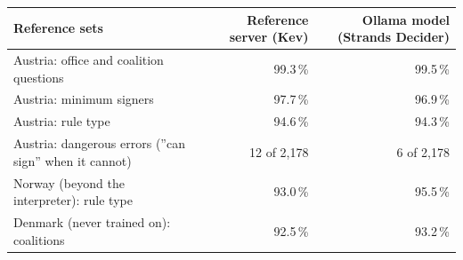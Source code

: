 \begin{tabular}{lrr}
\toprule
Reference sets & Reference server (Kev) & Ollama model (Strands Decider) \\
\midrule
Austria: office and coalition questions & 99.3\,\% & 99.5\,\% \\
Austria: minimum signers & 97.7\,\% & 96.9\,\% \\
Austria: rule type & 94.6\,\% & 94.3\,\% \\
Austria: dangerous errors (''can sign'' when it cannot) & 12 of 2,178 & 6 of 2,178 \\
Norway (beyond the interpreter): rule type & 93.0\,\% & 95.5\,\% \\
Denmark (never trained on): coalitions & 92.5\,\% & 93.2\,\% \\
\bottomrule
\end{tabular}
